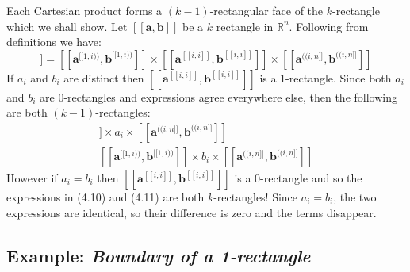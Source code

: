Each Cartesian product forms a $(k-1)$-rectangular face of the $k$-rectangle which we shall show.
Let $[\![ \boldsymbol{a}, \boldsymbol{b} ]\!]$ be a $k$ rectangle in $\mathbb{R}^n$.
Following from definitions we have:
\begin{equation}
	[\![ \boldsymbol{a}, \boldsymbol{b} ]\!] = 
		[\![\boldsymbol{a}^{[\![1,i)\!)}, \boldsymbol{b}^{[\![1,i)\!)} ]\!] \times 
		[\![\boldsymbol{a}^{[\![i,i]\!]}, \boldsymbol{b}^{[\![i,i]\!]} ]\!] \times
		[\![\boldsymbol{a}^{(\!(i,n]\!]}, \boldsymbol{b}^{(\!(i,n]\!]} ]\!]
\end{equation}
If $a_i$ and $b_i$ are distinct then $[\![\boldsymbol{a}^{[\![i,i]\!]}, \boldsymbol{b}^{[\![i,i]\!]} ]\!]$ is a 1-rectangle.
Since both $a_i$ and $b_i$ are 0-rectangles and expressions agree everywhere else, then the following are both $(k-1)$-rectangles:
\begin{align}
	[\![\boldsymbol{a}^{[\![1,i)\!)}, \boldsymbol{b}^{[\![1,i)\!)} ]\!]
	\times a_i \times
	[\![\boldsymbol{a}^{(\!(i,n]\!]}, \boldsymbol{b}^{(\!(i,n]\!]} ]\!]
	\\
	[\![\boldsymbol{a}^{[\![1,i)\!)}, \boldsymbol{b}^{[\![1,i)\!)} ]\!]
	\times b_i \times
	[\![\boldsymbol{a}^{(\!(i,n]\!]}, \boldsymbol{b}^{(\!(i,n]\!]} ]\!]
\end{align}
However if $a_i = b_i$ then $[\![\boldsymbol{a}^{[\![i,i]\!]}, \boldsymbol{b}^{[\![i,i]\!]} ]\!]$ is a 0-rectangle and so the expressions in (4.10) and (4.11) are both $k$-rectangles!
Since $a_i = b_i$, the two expressions are identical, so their difference is zero and the terms disappear.

\subsection{Example: \emph{Boundary of a 1-rectangle}}

